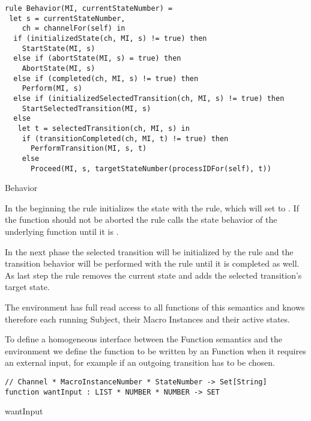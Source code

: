 \begin{listing}[htbp]
\begin{verbatim}
rule Behavior(MI, currentStateNumber) =
 let s = currentStateNumber,
    ch = channelFor(self) in
  if (initializedState(ch, MI, s) != true) then
    StartState(MI, s)
  else if (abortState(MI, s) = true) then
    AbortState(MI, s)
  else if (completed(ch, MI, s) != true) then
    Perform(MI, s)
  else if (initializedSelectedTransition(ch, MI, s) != true) then
    StartSelectedTransition(MI, s)
  else
   let t = selectedTransition(ch, MI, s) in
    if (transitionCompleted(ch, MI, t) != true) then
      PerformTransition(MI, s, t)
    else
      Proceed(MI, s, targetStateNumber(processIDFor(self), t))
\end{verbatim}
\caption{Behavior}
\label{lst:shortasm:Behavior}
\end{listing}


In the beginning the  rule initializes the state with the  rule, which will set  to . If the function should not be aborted the  rule calls the state behavior of the underlying function until it is .

In the next phase the selected transition will be initialized by the  rule and the transition behavior will be performed with the  rule until it is completed as well. As last step the  rule removes the current state and adds the selected transition's target state.


The environment has full read access to all functions of this semantics and knows therefore each running Subject, their Macro Instances and their active states.

To define a homogeneous interface between the Function semantics and the environment we define the function  to be written by an Function when it requires an external input, for example if an outgoing transition has to be chosen.



\begin{listing}[htbp]
\begin{verbatim}
// Channel * MacroInstanceNumber * StateNumber -> Set[String]
function wantInput : LIST * NUMBER * NUMBER -> SET
\end{verbatim}
\caption{wantInput}
\label{lst:shortasm:wantInput}
\end{listing}


